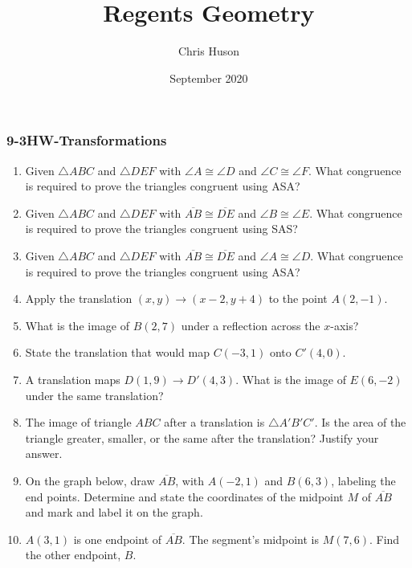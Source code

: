 \documentclass[12pt, twoside]{article}
\title{Regents Geometry}
\author{Chris Huson}
\date{September 2020}
\begin{document}
\subsubsection*{9-3HW-Transformations}
\begin{enumerate}
\item Given $\triangle ABC$ and $\triangle DEF$ with $\angle A \cong \angle D$ and $\angle C \cong \angle F$. What congruence is required to prove the triangles congruent using ASA? \vspace{3cm}
  
\item Given $\triangle ABC$ and $\triangle DEF$ with $\overline{AB} \cong \overline{DE}$ and $\angle B \cong \angle E$. What congruence is required to prove the triangles congruent using SAS? \vspace{3cm}
  
\item Given $\triangle ABC$ and $\triangle DEF$ with $\overline{AB} \cong \overline{DE}$ and $\angle A \cong \angle D$. What congruence is required to prove the triangles congruent using ASA? \vspace{3cm}
  
\item Apply the translation $(x,y) \rightarrow (x-2,y+4)$ to the point $A(2,-1)$. \vspace{2cm}
\item What is the image of $B(2,7)$ under a reflection across the $x$-axis? \vspace{2cm}
\item State the translation that would map $C(-3,1)$ onto $C'(4,0)$. \vspace{3cm}

  \newpage
\item A translation maps $D(1,9) \rightarrow D'(4,3)$. What is the image of $E(6,-2)$ under the same translation?  \vspace{3cm}

\item The image of triangle $ABC$ after a translation is $\triangle A'B'C'$. Is the area of the triangle greater, smaller, or the same after the translation? Justify your answer. \vspace{3cm}

\item On the graph below, draw $\overline{AB}$, with $A(-2,1)$ and $B(6,3)$, labeling the end points. Determine and state the coordinates of the midpoint $M$ of $\overline{AB}$ and mark and label it on the graph.\\
      \vspace{2cm}

\item $A(3,1)$ is one endpoint of $\overline{AB}$. The segment's midpoint is $M(7,6)$. Find the other endpoint, $B$. 
  
\end{enumerate}
\end{document}
